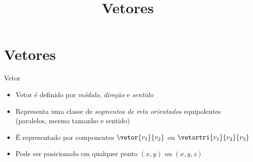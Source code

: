 \documentclass[fleqn,utf8,aspectratio=169,12pt]{beamer}
\title{Vetores}
\begin{document}
\addtitle

\section{Vetores}

\begin{frame}{Vetor}
\begin{itemize}[<+->]
  \setlength\itemsep{1em}
  \item Vetor é definido por \emph{módulo}, \emph{direção} e \emph{sentido}
  \item Representa uma classe de \emph{segmentos de reta orientados} equipolentes\\
        (paralelos, mesmo tamanho e sentido)
  \item É representado por componentes
        \(\vetor{v_1}{v_2}\) ou \(\vetortri{v_1}{v_2}{v_3}\)
  \item Pode ser posicionado em qualquer ponto \((x, y)\) ou \((x, y, z)\)
\end{itemize}
\end{frame}




\end{document}
